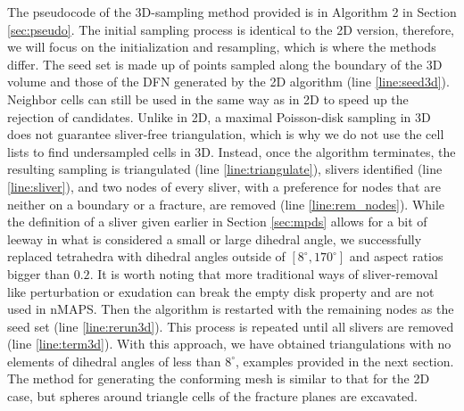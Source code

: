 \documentclass[preprint, 10pt]{elsarticle}
\theoremstyle{definition}
\theoremstyle{remark}
\begin{document}
The pseudocode of the 3D-sampling method provided is in Algorithm 2 in Section \ref{sec:pseudo}. 
The initial sampling process is identical to the 2D version, therefore, we will focus on the initialization and resampling, which is where the methods differ.
The seed set is made up of points sampled along the boundary of the 3D volume and those of the DFN generated by the 2D algorithm (line \ref{line:seed3d}).
Neighbor cells can still be used in the same way as in 2D to speed up the rejection of candidates. 
Unlike in 2D, a maximal Poisson-disk sampling in 3D does not guarantee sliver-free triangulation, which is why we do not use the cell lists to find undersampled cells in 3D. 
Instead, once the algorithm terminates, the resulting sampling is triangulated (line \ref{line:triangulate}), slivers identified (line \ref{line:sliver}), and two nodes of every sliver, with a preference for nodes that are neither on a boundary or a fracture, are removed (line \ref{line:rem_nodes}). 
While the definition of a sliver given earlier in Section \ref{sec:mpds} allows for a bit of leeway in what is considered a small or large dihedral angle, we successfully replaced tetrahedra with dihedral angles outside of $[8^\circ,170^\circ]$ and aspect ratios bigger than $0.2$.
It is worth noting that more traditional ways of sliver-removal like perturbation \cite{Perturbation} or exudation \cite{exudation} can break the empty disk property and are not used in nMAPS.
Then the algorithm is restarted with the remaining nodes as the seed set (line \ref{line:rerun3d}). 
This process is repeated until all slivers are removed (line \ref{line:term3d}).
With this approach, we have obtained triangulations with no elements of dihedral angles of less than  $8^\circ$, examples provided in the next section.
The method for generating the conforming mesh is similar to that for the 2D case, but spheres around triangle cells of the fracture planes are excavated. 

\end{document}
